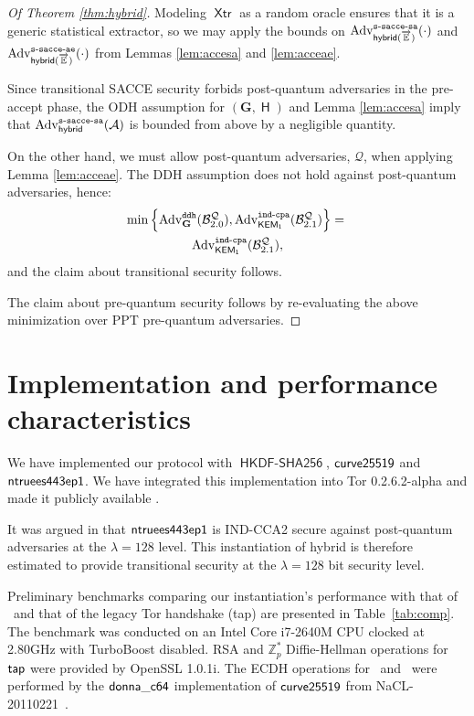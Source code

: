 \documentclass[USenglish,oneside,twocolumn]{article}
\theoremstyle{dgthm}
\theoremstyle{dgdef}
\newcommand{\Protocol}[1]{\operatorname{\mathsf{#1}}}
\newcommand{\ntor}{{\sf {ntor}}}
\newcommand{\hybrid}{{\sf {hybrid}}}
\newcommand{\djbcurve}{{\sf {curve25519}}}
\newcommand{\AlgorithmName}[1]{\operatorname{\mathsf{#1}}}
\newcommand{\Hash}{\AlgorithmName{H}}
\newcommand{\XTR}{\AlgorithmName{Xtr}}
\newcommand{\HKDFS}{\AlgorithmName{HKDF-SHA256}}
\newcommand{\Oracle}[1]{\mathcal #1}
\newcommand{\Experiment}[1]{\operatorname{\tt{#1}}}
\newcommand{\Algorithm}[1]{\mathcal #1}
\newcommand{\AdvName}[2]{\operatorname{\mathrm{Adv}_{\Protocol{#1}}^{\Experiment{#2}}}}
\newcommand{\Adv}[3]{\AdvName{#1}{#2}(\Algorithm{#3})}
\newcommand{\SAcceSaNtor}[1]{\Adv{hybrid}{s-sacce-sa}{#1}}
\newcommand{\SAcceSaHybridK}[1]{\Adv{hybrid(\overrightarrow{\mathbb{E}})}{s-sacce-sa}{#1}}
\newcommand{\SAcceAeHybridK}[1]{\Adv{hybrid(\overrightarrow{\mathbb{E}})}{s-sacce-ae}{#1}}
\newcommand{\IndCpa}[2]{\Adv{#1}{ind-cpa}{#2}}
\newcommand{\AdvDdh}[1]{\Adv{\mathbf{G}}{ddh}{#1}}
\begin{document}
  \begin{proof}[Of Theorem \ref{thm:hybrid}]
    Modeling $\XTR$ as a random oracle ensures that it is a generic statistical
    extractor, so we may apply the bounds on $\SAcceSaHybridK{\cdot}$ and
    $\SAcceAeHybridK{\cdot}$ from Lemmas \ref{lem:accesa} and \ref{lem:acceae}.

    Since transitional SACCE security forbids post-quantum adversaries in the
    pre-accept phase, the ODH assumption for $(\mathbf{G}, \Hash)$ and Lemma
    \ref{lem:accesa} imply that $\SAcceSaNtor{A}$ is bounded from above by a
    negligible quantity.

    On the other hand, we must allow post-quantum adversaries, $\Oracle{Q}$, when applying Lemma \ref{lem:acceae}.
    The DDH assumption does not hold against post-quantum adversaries, hence:
    \begin{multline}
      \min\left\{\AdvDdh{B_{2.0}^{\Oracle{Q}}}, \IndCpa{KEM_1}{B_{2.1}^{\Oracle{Q}}}\right\} ={}\\
      \IndCpa{KEM_1}{B_{2.1}^{\Oracle{Q}}},\notag
    \end{multline}
    and the claim about transitional security follows.

    The claim about pre-quantum security follows by re-evaluating the above
    minimization over PPT pre-quantum adversaries.
  \end{proof}


\section{Implementation and performance characteristics} \label{sec:perf}

  We have implemented our protocol with $\HKDFS$,  $\djbcurve$ and
  ${\sf ntruees443ep1}$. We have integrated this implementation into Tor
  0.2.6.2-alpha and made it publicly available \cite{ntrutorsource}.

  It was argued in \cite{HoffsteinPSSWZ15} that ${\sf ntruees443ep1}$ is
  IND-CCA2 secure against post-quantum adversaries at the $\lambda=128$ level.
  This instantiation of hybrid is therefore estimated to provide transitional
  security at the $\lambda = 128$ bit security level.

  Preliminary benchmarks comparing our instantiation's performance with that of
  \ntor~and that of the legacy Tor handshake ({\sf tap}) are presented in
  Table~\ref{tab:comp}.  The benchmark was conducted on an Intel Core i7-2640M
  CPU clocked at 2.80GHz with TurboBoost disabled. RSA and $\mathbb{Z}_p^*$
  Diffie-Hellman operations for ${\sf tap}$ were provided by OpenSSL 1.0.1i.
  The ECDH operations for \ntor~and \hybrid~were performed by the ${\sf
  donna\_c64}$ implementation of $\djbcurve$ from
  NaCL-20110221~\cite{nacl_code}.
\end{document}
